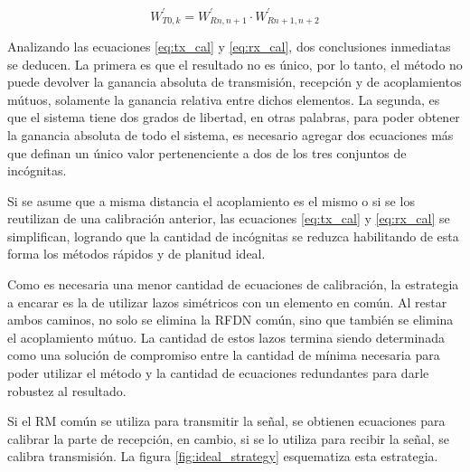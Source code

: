 \begin{equation}
	W^{'}_{T0,k} = W^{'}_{Rn,n+1}\cdot W^{'}_{Rn+1,n + 2}
	\label{eq:tx_cal}
\end{equation}

Analizando las ecuaciones \ref{eq:tx_cal} y \ref{eq:rx_cal}, dos conclusiones inmediatas se deducen. La primera es que el 
resultado no es único, por lo tanto, el método no puede devolver la ganancia absoluta de transmisión, recepción y de
acoplamientos mútuos, solamente la ganancia relativa entre dichos elementos. La segunda, es que el sistema tiene dos grados 
de libertad, en otras palabras, para poder obtener la ganancia absoluta de todo el sistema, es necesario agregar dos ecuaciones
más que definan un único valor pertenenciente a dos de los tres conjuntos de incógnitas.

Si se asume que a misma distancia el acoplamiento es el mismo o si se los reutilizan de una calibración anterior, las 
ecuaciones \ref{eq:tx_cal} y \ref{eq:rx_cal} se simplifican, logrando que la cantidad de incógnitas se reduzca habilitando 
de esta forma los métodos rápidos y de planitud ideal.


Como es necesaria una menor cantidad de ecuaciones de calibración, la estrategia a encarar es la de utilizar lazos simétricos 
con un elemento en común. Al restar ambos caminos, no solo se elimina la RFDN común, sino que también se elimina el 
acoplamiento mútuo. La cantidad de estos lazos termina siendo determinada como una solución de compromiso entre la cantidad de
mínima necesaria para poder utilizar el método y la cantidad de ecuaciones redundantes para darle robustez al resultado.

Si el RM común se utiliza para transmitir la señal, se obtienen ecuaciones para calibrar la parte de recepción, en cambio, 
si se lo utiliza para recibir la señal, se calibra transmisión. La figura \ref{fig:ideal_strategy} esquematiza esta estrategia.

